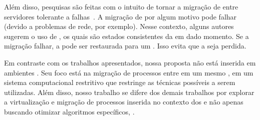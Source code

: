     Além disso, pesquisas são feitas com o intuito de tornar a migração de \vms entre servidores tolerante a falhas~\cite{fernando2019live}. A migração de \vms por algum motivo pode falhar (devido a problemas de rede, por exemplo). Nesse contexto, alguns autores sugerem o uso de \checkpoints, os quais são estados consistentes da \vm em dado momento. Se a migração falhar, a \vm pode ser restaurada para um \checkpoint. Isso evita que a \vm seja perdida.

Em contraste com os trabalhos apresentados, nossa proposta não está inserida em ambientes \cloud. Seu foco está na migração de processos entre \clusters em um mesmo \chip, em um sistema computacional restritivo que restringe as técnicas possíveis a serem utilizadas. Além disso, nosso trabalho se difere dos demais trabalhos por explorar a virtualização e migração de processos inserida no contexto dos \lws e não apenas buscando otimizar algoritmos específicos, \eg \livemigration.